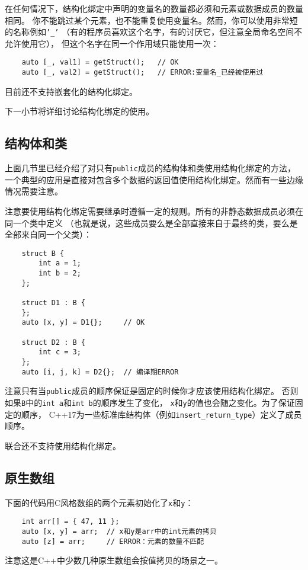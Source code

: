 在任何情况下，结构化绑定中声明的变量名的数量都必须和元素或数据成员的数量相同。
你不能跳过某个元素，也不能重复使用变量名。然而，你可以使用非常短的名称例如\texttt{'\_'}
（有的程序员喜欢这个名字，有的讨厌它，但注意全局命名空间不允许使用它），
但这个名字在同一个作用域只能使用一次：
\begin{lstlisting}
    auto [_, val1] = getStruct();   // OK
    auto [_, val2] = getStruct();   // ERROR:变量名_已经被使用过
\end{lstlisting}
目前还不支持嵌套化的结构化绑定。

下一小节将详细讨论结构化绑定的使用。

\subsection{结构体和类}
上面几节里已经介绍了对只有\texttt{public}成员的结构体和类使用结构化绑定的方法，
一个典型的应用是直接对包含多个数据的返回值使用结构化绑定。然而有一些边缘情况需要注意。

注意要使用结构化绑定需要继承时遵循一定的规则。所有的非静态数据成员必须在同一个类中定义
（也就是说，这些成员要么是全部直接来自于最终的类，要么是全部来自同一个父类）：
\begin{lstlisting}
    struct B {
        int a = 1;
        int b = 2;
    };

    struct D1 : B {
    };
    auto [x, y] = D1{};     // OK

    struct D2 : B {
        int c = 3;
    };
    auto [i, j, k] = D2{};  // 编译期ERROR
\end{lstlisting}
注意只有当\texttt{public}成员的顺序保证是固定的时候你才应该使用结构化绑定。
否则如果\texttt{B}中的\texttt{int a}和\texttt{int b}的顺序发生了变化，
\texttt{x}和\texttt{y}的值也会随之变化。为了保证固定的顺序，
C++17为一些标准库结构体（例如\texttt{insert\_return\_type}）定义了成员顺序。

联合还不支持使用结构化绑定。

\subsection{原生数组}
下面的代码用C风格数组的两个元素初始化了\texttt{x}和\texttt{y}：
\begin{lstlisting}
    int arr[] = { 47, 11 };
    auto [x, y] = arr;  // x和y是arr中的int元素的拷贝
    auto [z] = arr;     // ERROR：元素的数量不匹配
\end{lstlisting}
注意这是C++中少数几种原生数组会按值拷贝的场景之一。

